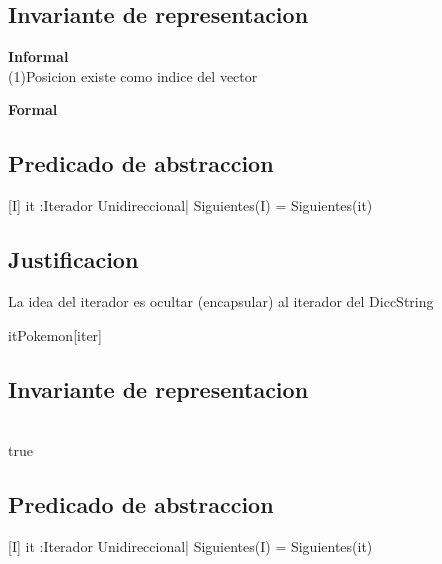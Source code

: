 \begin{Representacion}
\subsection{Invariante de representacion}

\textbf{Informal}\\
(1)Posicion existe como indice del vector

\textbf{Formal}\\

\subsection{Predicado de abstraccion}

[I]{ it :Iterador Unidireccional| Siguientes(I) = Siguientes(it)}


\subsection{Justificacion}
	La idea del iterador es ocultar (encapsular) al iterador del DiccString
	
		\begin{Estructura}{itPokemon}[iter]
			\begin{Tupla}[iter]
			\end{Tupla}
		\end{Estructura}

\subsection{Invariante de representacion}

\\
true


\subsection{Predicado de abstraccion}

[I]{ it :Iterador Unidireccional| Siguientes(I) = Siguientes(it)}

\end{Representacion}


